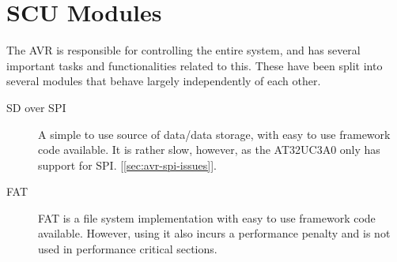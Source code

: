 \section{SCU Modules}
 

The AVR is responsible for controlling the entire system, and has several
important tasks and functionalities related to this. These have been split
into several modules that behave largely independently of each other.
\begin{description}

\item[SD over SPI] A simple to use source of data/data storage, with easy to use
  framework code available. It is rather slow, however, as the AT32UC3A0 only has
  support for SPI. [\ref{sec:avr-spi-issues}].


\item[FAT] FAT is a file system implementation with easy to use framework
  code available. However, using it also incurs a performance penalty and is not
  used in performance critical sections.



\end{description}

